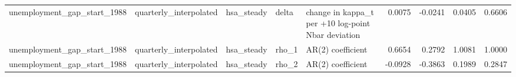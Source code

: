 \begin{tabular}{lllllrrrr}
unemployment\_gap\_start\_1988 & quarterly\_interpolated & hsa\_steady & delta & change in kappa\_t per +10 log-point Nbar deviation & 0.0075 & -0.0241 & 0.0405 & 0.6606 \\
unemployment\_gap\_start\_1988 & quarterly\_interpolated & hsa\_steady & rho\_1 & AR(2) coefficient & 0.6654 & 0.2792 & 1.0081 & 1.0000 \\
unemployment\_gap\_start\_1988 & quarterly\_interpolated & hsa\_steady & rho\_2 & AR(2) coefficient & -0.0928 & -0.3863 & 0.1989 & 0.2847 \\
\bottomrule
\end{tabular}
